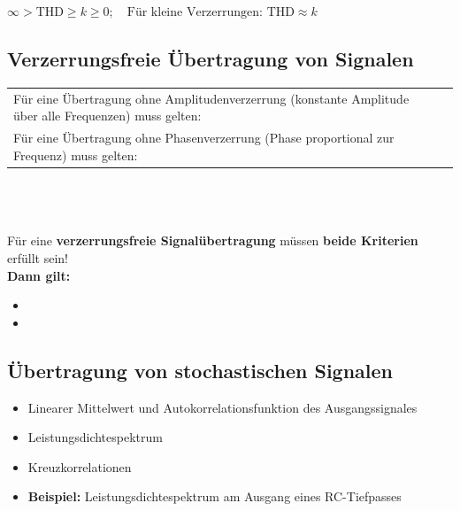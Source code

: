 			\begin{center}
				$\infty > \text{THD} \geq k \geq 0; \quad \text{Für kleine Verzerrungen: THD} \approx k $
			\end{center}

		
		\subsection{Verzerrungsfreie Übertragung von Signalen }
		
			\begin{tabularx}{\textwidth}{p{9cm}X}
				Für eine Übertragung ohne Amplitudenverzerrung \newline (konstante Amplitude über alle Frequenzen) muss gelten:
			&	$ $ \newline \fbox{$|H(j\omega)| = konstant$}
			\\
			Für eine Übertragung ohne Phasenverzerrung \newline (Phase proportional zur Frequenz) muss gelten:
			&	$ $ \newline \fbox{$\theta(\omega) = -\omega t_0$}
			\end{tabularx}\\
			\\ \\
			Für eine \textbf{verzerrungsfreie Signalübertragung} müssen \textbf{beide Kriterien} erfüllt sein!\\
			\textbf{Dann gilt:}
			\begin{itemize}
				\item {}
				\item {}
			\end{itemize}	
		
	\subsection{Übertragung von stochastischen Signalen }
		\begin{itemize}
			\item Linearer Mittelwert und Autokorrelationsfunktion des Ausgangssignales 
			\item Leistungsdichtespektrum 
			\item Kreuzkorrelationen 
			\item \textbf{Beispiel:} Leistungsdichtespektrum am Ausgang eines RC-Tiefpasses 
		\end{itemize}
		
		
		
		
		
		
		